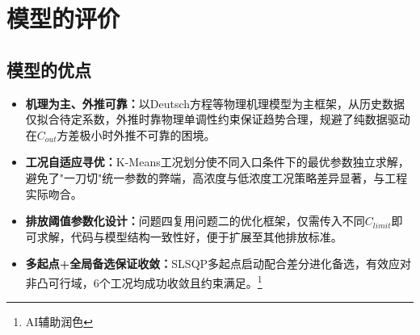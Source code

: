 
\section{模型的评价}

\subsection{模型的优点}
\begin{itemize}[itemindent=2em]
\item \textbf{机理为主、外推可靠：}以Deutsch方程等物理机理模型为主框架，从历史数据仅拟合待定系数，外推时靠物理单调性约束保证趋势合理，规避了纯数据驱动在$C_{out}$方差极小时外推不可靠的困境。
\item \textbf{工况自适应寻优：}K-Means工况划分使不同入口条件下的最优参数独立求解，避免了"一刀切"统一参数的弊端，高浓度与低浓度工况策略差异显著，与工程实际吻合。
\item \textbf{排放阈值参数化设计：}问题四复用问题二的优化框架，仅需传入不同$C_{limit}$即可求解，代码与模型结构一致性好，便于扩展至其他排放标准。
\item \textbf{多起点+全局备选保证收敛：}SLSQP多起点启动配合差分进化备选，有效应对非凸可行域，6个工况均成功收敛且约束满足。\footnote{AI辅助润色}
\end{itemize}